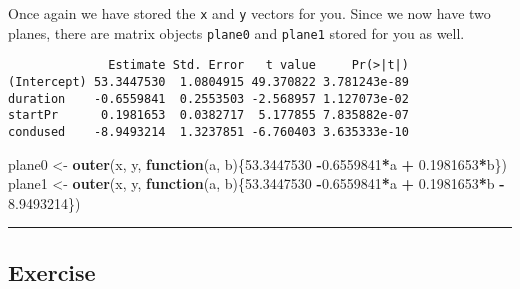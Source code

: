 \documentclass[]{book}
\newenvironment{Shaded}{\begin{snugshade}}{\end{snugshade}}
\newcommand{\KeywordTok}[1]{\textcolor[rgb]{0.13,0.29,0.53}{\textbf{#1}}}
\newcommand{\DataTypeTok}[1]{\textcolor[rgb]{0.13,0.29,0.53}{#1}}
\newcommand{\FloatTok}[1]{\textcolor[rgb]{0.00,0.00,0.81}{#1}}
\newcommand{\StringTok}[1]{\textcolor[rgb]{0.31,0.60,0.02}{#1}}
\newcommand{\ControlFlowTok}[1]{\textcolor[rgb]{0.13,0.29,0.53}{\textbf{#1}}}
\newcommand{\OperatorTok}[1]{\textcolor[rgb]{0.81,0.36,0.00}{\textbf{#1}}}
\newcommand{\NormalTok}[1]{#1}
\begin{document}
Once again we have stored the \texttt{x} and \texttt{y} vectors for you.
Since we now have two planes, there are matrix objects \texttt{plane0}
and \texttt{plane1} stored for you as well.

\begin{Shaded}
\end{Shaded}

\begin{verbatim}
              Estimate Std. Error   t value     Pr(>|t|)
(Intercept) 53.3447530  1.0804915 49.370822 3.781243e-89
duration    -0.6559841  0.2553503 -2.568957 1.127073e-02
startPr      0.1981653  0.0382717  5.177855 7.835882e-07
condused    -8.9493214  1.3237851 -6.760403 3.635333e-10
\end{verbatim}

\begin{Shaded}
\begin{Highlighting}[]
\NormalTok{plane0 <-}\StringTok{ }\KeywordTok{outer}\NormalTok{(x, y, }\ControlFlowTok{function}\NormalTok{(a, b)\{}\FloatTok{53.3447530} \OperatorTok{-}\FloatTok{0.6559841}\OperatorTok{*}\NormalTok{a }\OperatorTok{+}\StringTok{ }
\StringTok{                                      }\FloatTok{0.1981653}\OperatorTok{*}\NormalTok{b\})}
\NormalTok{plane1 <-}\StringTok{ }\KeywordTok{outer}\NormalTok{(x, y, }\ControlFlowTok{function}\NormalTok{(a, b)\{}\FloatTok{53.3447530} \OperatorTok{-}\FloatTok{0.6559841}\OperatorTok{*}\NormalTok{a }\OperatorTok{+}
\StringTok{                                      }\FloatTok{0.1981653}\OperatorTok{*}\NormalTok{b }\OperatorTok{-}\StringTok{ }\FloatTok{8.9493214}\NormalTok{\})}
\end{Highlighting}
\end{Shaded}

\begin{center}\rule{0.5\linewidth}{\linethickness}\end{center}

\subsection*{Exercise}\label{exercise-11}
\end{document}
